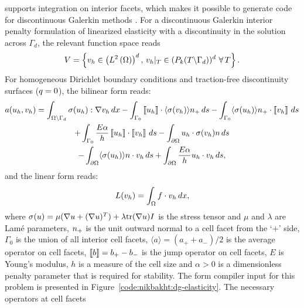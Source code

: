 \ffc{} supports integration on interior facets, which makes
it possible to generate code for discontinuous Galerkin methods
\citep{OelgaardLoggWells2008}.  For a discontinuous Galerkin interior
penalty formulation of linearized elasticity with a discontinuity in
the solution across $\Gamma_{d}$, the relevant function space reads
%
\begin{equation}
 V = \bracc{\vect{v}_{h} \in \brac{L^{2}\brac{\Omega}}^{d}, \,
            \vect{v}_{h}|_T \in (P_{k}(T\backslash\Gamma_{d}))^{d} \ \foralls T}.
\end{equation}
%
For homogeneous Dirichlet boundary conditions and traction-free
discontinuity surfaces ($q = 0$), the bilinear form reads:
%
\begin{multline}
 a(u_{h}, v_{h}) = \int_{\Omega \backslash \Gamma_{d}} \sigma(u_{h})
                                :  \nabla v_{h} \, d x
 -  \int_{\Gamma_0} \left\llbracket {u_{h}} \right\rrbracket \cdot \langle \sigma(v_{h}) \rangle n_{+} \, d s
 - \int_{\Gamma_{0}} \langle \sigma(u_{h}) \rangle n_{+} \cdot \left\llbracket {v_{h}} \right\rrbracket  \, d s
\\
 + \int_{\Gamma_0} \frac{E \alpha}{h}  \left\llbracket {u_{h}} \right\rrbracket \cdot \left\llbracket {v_{h}} \right\rrbracket \, d s
 -  \int_{\partial \Omega} u_{h} \cdot \sigma(v_{h})n \, d s
\\
 - \int_{\partial \Omega} \langle \sigma(u_{h}) \rangle n \cdot v_{h}  \, d s
 + \int_{\partial \Omega} \frac{E \alpha}{h}  u_{h} \cdot v_{h} \, d s,
\end{multline}
%
and the linear form reads:
%
\begin{equation}
 L(v_{h}) = \int_{\Omega} f \cdot v_{h} \, d x,
\end{equation}
%
where
$\sigma(u)
= \mu(\nabla u + (\nabla u)^{T} )
+ \lambda {\rm tr}(\nabla u) I$
is the stress tensor and $\mu$ and $\lambda$ are Lam\'e parameters,
$n_{+}$ is the unit outward normal to a cell facet from the `$+$' side,
$\Gamma_0$ is the union of all interior cell facets,
$\langle a \rangle = (a_{+} + a_{-})/2$ is the  average operator on cell facets,
$\left\llbracket {b} \right\rrbracket = b_{+} - b_{-}$ is the jump operator on cell facets,
$E$ is Young's modulus, $h$ is a measure of the cell size
and $\alpha > 0$ is a dimensionless penalty parameter that
is required for stability.
The form compiler input for this problem is presented in
Figure~\ref{code:nikbakht:dg-elasticity}. The necessary operators at cell facets
